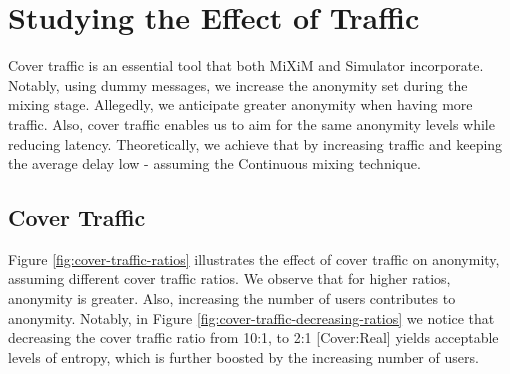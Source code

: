 \documentclass[logo,msc,cyber]{infthesis}   %
\begin{document}
\section{Studying the Effect of Traffic}

Cover traffic is an essential tool that both MiXiM and Simulator incorporate.
Notably, using dummy messages, we increase the anonymity set during the mixing
stage. Allegedly, we anticipate greater anonymity when having more traffic.
Also, cover traffic enables us to aim for the same anonymity levels while
reducing latency. Theoretically, we achieve that by increasing traffic and
keeping the average delay low - assuming the Continuous mixing technique. 

\subsection{Cover Traffic}

Figure \ref{fig:cover-traffic-ratios} illustrates the effect of cover traffic on
anonymity, assuming different cover traffic ratios. We observe that for higher
ratios, anonymity is greater. Also, increasing the number of users contributes
to anonymity. Notably, in Figure \ref{fig:cover-traffic-decreasing-ratios} we
notice that decreasing the cover traffic ratio from 10:1,  to 2:1 [Cover:Real]
yields acceptable levels of entropy, which is further boosted by the increasing
number of users. 
\end{document}
